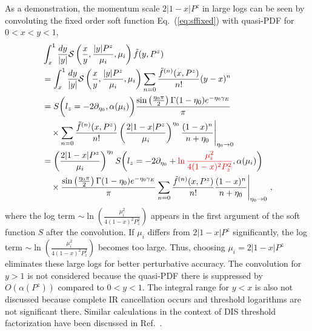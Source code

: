 \documentclass[a4paper,11pt]{article}
\begin{document}
As a demonstration, the momentum scale $2|1-x|P^z$ in large logs can be seen by convoluting the fixed order soft function Eq.~(\ref{eq:sffixed}) with quasi-PDF for $0<x<y<1$,
\begin{align}
&\int_{x}^{1} \frac{d y}{|y|} {\cal S}\left( \frac{x}{y},\frac{|y|P^z}{\mu_i},\mu_i\right) \tilde f(y,P^z)   \nonumber\\
&=\int_{x}^{1} \frac{d y}{|y|} {\cal S}\left( \frac{x}{y},\frac{|y|P^z}{\mu_i},\mu_i\right) \sum_{n=0} \frac{\tilde f^{(n)}(x,P^z)}{n!}(y-x)^n   \nonumber\\
&= S\bigg(l_z=-2 \partial_{\eta_{0}},\alpha(\mu_i)\bigg) \frac{ \sin \left(\frac{\eta_{0} \pi}{2}\right) \Gamma(1-\eta_{0}) e^{-\eta_{0} \gamma_E}}{\pi} \nonumber\\
&\quad \times \sum_{n=0} \frac{\tilde f^{(n)}(x,P^z)}{n!} \left(\frac{2|1-x|P^z}{\mu_i}\right)^{\eta_{0}} \frac{(1-x)^n}{n+\eta_{0}} \Bigg|_{\eta_0 \rightarrow 0} \nonumber\\ 
&=\left(\frac{2|1-x|P^z}{\mu_i}\right)^{\eta_{0}} S\bigg(l_z=-2 \partial_{\eta_{0}} + { \color{red} \ln\frac{\mu_i^2}{4 (1-x)^2 P_z^2} },\alpha(\mu_i)\bigg) \nonumber\\ 
&\quad \times \frac{ \sin \left(\frac{\eta_{0} \pi}{2}\right) \Gamma(1-\eta_{0}) e^{-\eta_{0} \gamma_E}}{\pi} \sum_{n=0} \frac{\tilde f^{(n)}(x,P^z)}{n!}  \frac{(1-x)^n}{n+\eta_{0}} \Bigg|_{\eta_0 \rightarrow 0} \ ,
\end{align}
where the log term $\sim \ln\left(\frac{\mu_i^2}{4(1-x)^2 P_z^2}\right)$ appears in the first argument of the soft function $S$ after the convolution. If $\mu_i$ differs from $2|1-x|P^z$ significantly, the log term $\sim \ln\left(\frac{\mu_i^2}{4(1-x)^2 P_z^2}\right)$ becomes too large. Thus, choosing $\mu_i = 2|1-x|P^z$ eliminates these large logs for better perturbative accuracy. The convolution for $y>1$ is not considered because the quasi-PDF there is suppressed by $O(\alpha(P^z))$ compared to $0<y<1$. The integral range for $y<x$ is also not discussed because complete IR cancellation occurs and threshold logarithms are not significant there. Similar calculations in the context of DIS threshold factorization have been discussed in Ref.~\cite{Becher:2006mr}.
\end{document}
